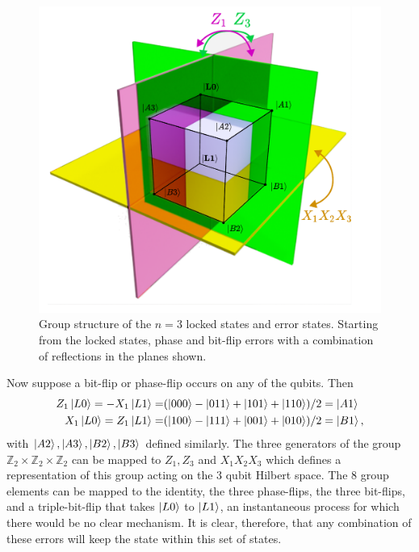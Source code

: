 \documentclass{report}
\begin{document}
\begin{appendices}
\begin{figure}[ht]
    \centering
    \includegraphics[scale = 0.6]{Figures/group/group.pdf}
    \caption{Group structure of the $n=3$ locked states and error states. Starting from the locked states, phase and bit-flip errors with a combination of reflections in the planes shown.
    }\label{fig:group}
\end{figure}
Now suppose a bit-flip or phase-flip occurs on any of the qubits. Then 
\begin{align*}
    Z_1\ket{L0} = -X_1\ket{L1} = &(\ket{000} - \ket{011} + \ket{101} + \ket{110})/2 = \ket{A1}\\
    X_1\ket{L0} = Z_1\ket{L1} = &(\ket{100} - \ket{111} + \ket{001} + \ket{010})/2 = \ket{B1},
\end{align*} with $\ket{A2},\ket{A3},\ket{B2},\ket{B3}$ defined similarly. The three generators of the group $\mathbb{Z}_2\times\mathbb{Z}_2\times\mathbb{Z}_2$ can be mapped to $Z_1, Z_3$ and $X_1X_2X_3$ which defines a representation of this group acting on the 3 qubit Hilbert space. The 8 group elements can be mapped to the identity, the three phase-flips, the three bit-flips, and a triple-bit-flip that takes $\ket{L0}$ to $\ket{L1}$, an instantaneous process for which there would be no clear mechanism. It is clear, therefore, that any combination of these errors will keep the state within this set of states.


\end{appendices}
\end{document}
